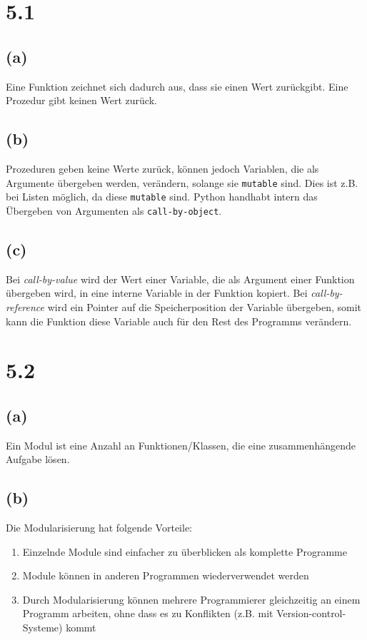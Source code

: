 \section*{5.1}
\subsection*{(a)}
Eine Funktion zeichnet sich dadurch aus, dass sie einen Wert zurückgibt. Eine Prozedur gibt keinen Wert zurück.

\subsection*{(b)}
Prozeduren geben keine Werte zurück, können jedoch Variablen, die als Argumente übergeben werden, verändern, solange sie \verb+mutable+ sind.
Dies ist z.B. bei Listen möglich, da diese \verb+mutable+ sind. Python handhabt intern das Übergeben von Argumenten als \verb+call-by-object+.

\subsection*{(c)}
Bei \textit{call-by-value} wird der Wert einer Variable, die als Argument einer Funktion übergeben wird, in eine interne Variable in der Funktion kopiert. Bei \textit{call-by-reference} wird ein Pointer auf die Speicherposition der Variable übergeben, somit kann die Funktion diese Variable auch für den Rest des Programms verändern.

\section*{5.2}
\subsection*{(a)}
Ein Modul ist eine Anzahl an Funktionen/Klassen, die eine zusammenhängende Aufgabe lösen.

\subsection*{(b)}
Die Modularisierung hat folgende Vorteile:
\begin{enumerate}
\item Einzelnde Module sind einfacher zu überblicken als komplette Programme
\item Module können in anderen Programmen wiederverwendet werden
\item Durch Modularisierung können mehrere Programmierer gleichzeitig an einem Programm arbeiten, ohne dass es zu Konflikten (z.B. mit Version-control-Systeme) kommt
\end{enumerate}

